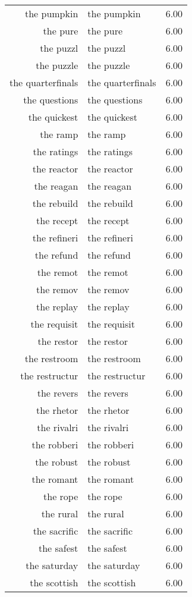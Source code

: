 \begin{table}[ht]
\begin{tabular}{rlr}
  the pumpkin & the pumpkin & 6.00 \\ 
  the pure & the pure & 6.00 \\ 
  the puzzl & the puzzl & 6.00 \\ 
  the puzzle & the puzzle & 6.00 \\ 
  the quarterfinals & the quarterfinals & 6.00 \\ 
  the questions & the questions & 6.00 \\ 
  the quickest & the quickest & 6.00 \\ 
  the ramp & the ramp & 6.00 \\ 
  the ratings & the ratings & 6.00 \\ 
  the reactor & the reactor & 6.00 \\ 
  the reagan & the reagan & 6.00 \\ 
  the rebuild & the rebuild & 6.00 \\ 
  the recept & the recept & 6.00 \\ 
  the refineri & the refineri & 6.00 \\ 
  the refund & the refund & 6.00 \\ 
  the remot & the remot & 6.00 \\ 
  the remov & the remov & 6.00 \\ 
  the replay & the replay & 6.00 \\ 
  the requisit & the requisit & 6.00 \\ 
  the restor & the restor & 6.00 \\ 
  the restroom & the restroom & 6.00 \\ 
  the restructur & the restructur & 6.00 \\ 
  the revers & the revers & 6.00 \\ 
  the rhetor & the rhetor & 6.00 \\ 
  the rivalri & the rivalri & 6.00 \\ 
  the robberi & the robberi & 6.00 \\ 
  the robust & the robust & 6.00 \\ 
  the romant & the romant & 6.00 \\ 
  the rope & the rope & 6.00 \\ 
  the rural & the rural & 6.00 \\ 
  the sacrific & the sacrific & 6.00 \\ 
  the safest & the safest & 6.00 \\ 
  the saturday & the saturday & 6.00 \\ 
  the scottish & the scottish & 6.00 \\ 

\end{tabular}
\end{table}
